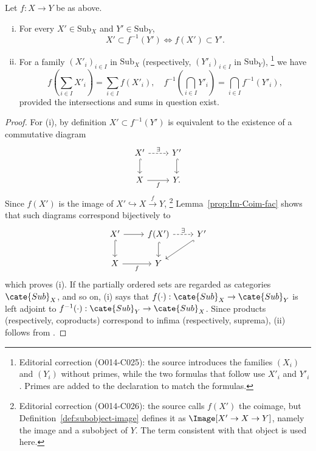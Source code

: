 \begin{lemma}\label{prop:image-sum-preimage-intersection}
	Let $f:X\to Y$ be as above.
	\begin{enumerate}[(i)]
		\item For every $X'\in\mathrm{Sub}_X$ and $Y'\in\mathrm{Sub}_Y$,
		\[ X' \subset f^{-1}(Y') \iff f(X') \subset Y'. \]
		\item For a family $(X'_i)_{i\in I}$ in $\mathrm{Sub}_X$
		(respectively, $(Y'_i)_{i\in I}$ in $\mathrm{Sub}_Y$),%
		\footnote{Editorial correction (O014-C025): the source introduces the
		families $(X_i)$ and $(Y_i)$ without primes, while the two formulas that
		follow use $X'_i$ and $Y'_i$. Primes are added to the declaration to
		match the formulas.}
		we have
		\[ f\left( \sum_{i \in I} X'_i \right) = \sum_{i \in I} f(X'_i), \quad f^{-1}\left( \bigcap_{i \in I} Y'_i \right) = \bigcap_{i \in I} f^{-1}(Y'_i), \]
		provided the intersections and sums in question exist.
	\end{enumerate}
\end{lemma}
\begin{proof}
	For (i), by definition $X'\subset f^{-1}(Y')$ is equivalent to the
	existence of a commutative diagram
	\[\begin{tikzcd}
		X' \arrow[dashed, r, "\exists"] \arrow[hookrightarrow, d] & Y' \arrow[hookrightarrow, d] \\
		X \arrow[r, "f"'] & Y .
	\end{tikzcd}\]
	Since $f(X')$ is the image of
	$X'\hookrightarrow X\xrightarrow{f}Y$,%
	\footnote{Editorial correction (O014-C026): the source calls $f(X')$ the
	coimage, but Definition~\ref{def:subobject-image} defines it as
	$\Image[X'\to X\to Y]$, namely the image and a subobject of $Y$. The term
	consistent with that object is used here.}
	Lemma~\ref{prop:Im-Coim-fac} shows that such diagrams correspond bijectively
	to
	\[\begin{tikzcd}
		X' \arrow[r] \arrow[d, hookrightarrow] & f(X') \arrow[hookrightarrow, d] \arrow[dashed, r, "\exists"] & Y' \arrow[hookrightarrow, ld] \\
		X \arrow[r, "f"'] & Y &
	\end{tikzcd}\]
	which proves (i). If the partially ordered sets are regarded as categories
	$\cate{Sub}_X$, and so on, (i) says that
	$f(\cdot):\cate{Sub}_X\to\cate{Sub}_Y$ is left adjoint to
	$f^{-1}(\cdot):\cate{Sub}_Y\to\cate{Sub}_X$. Since products
	(respectively, coproducts) correspond to infima (respectively, suprema),
	(ii) follows from \cite[Theorem 2.8.12]{Li1}.
\end{proof}


